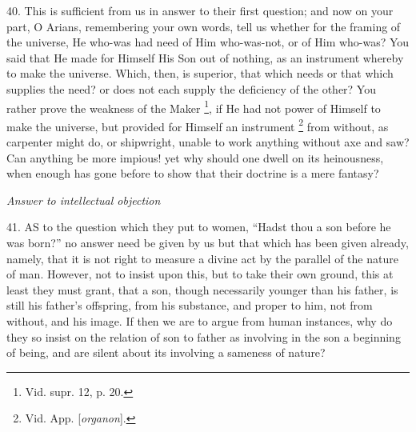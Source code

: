 40. This is sufficient from us
in answer to their first question; and now on your part, O Arians,
remembering your own words, tell us whether for the framing of the
universe, He who-was had need of Him who-was-not, or of Him who-was?
You said that He made for Himself His Son out of nothing, as an
instrument whereby to make the universe. Which, then, is superior,
that which needs or that which supplies the need? or does not each
supply the deficiency of the other? You rather prove the weakness of
the Maker \footnote{Vid. supr. 12, p. 20.}, if He had
not power of Himself to make the universe, but provided for Himself an
instrument \footnote{Vid. App. [\emph{organon}].} from
without, as carpenter might do, or shipwright, unable to work anything
without axe and saw? Can anything be more impious! yet why
should one dwell on its heinousness, when enough has gone before to
show that their doctrine is a mere fantasy?


\emph{Answer
to intellectual objection}

41. AS
to the question which they put to women, ``Hadst thou a son before he
was born?'' no answer need be given by us but that which has been given
already, namely, that it is not right to measure a divine act by the
parallel of the nature of man. However, not to insist upon this, but
to take their own ground, this at least they must grant, that a son,
though necessarily younger than his father, is still his father's
offspring, from his substance, and proper to him, not from without,
and his image. If then we are to argue from human instances, why do
they so insist on the relation of son to father as involving in the
son a beginning of being, and are silent about its involving a
sameness of nature?

